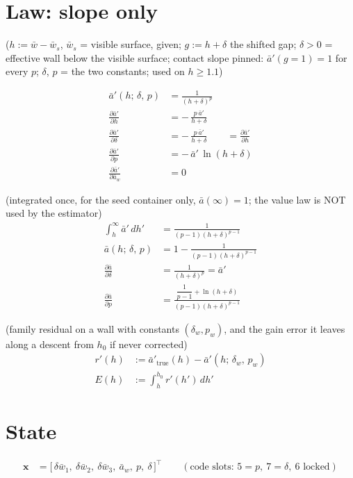 \documentclass[11pt,a4paper,fontset=none]{ctexart}
\newcommand{\ba}{\bar{a}}
\newcommand{\bw}{\bar{w}}
\newcommand{\ap}{\ba'}
\newcommand{\dl}{\delta}
\newcommand{\gs}{g}
\begin{document}
\section{Law: slope only}

($h := \bw - \bw_s$, $\bw_s$ = visible surface, given; $\gs := h + \dl$ the shifted gap; $\dl > 0$ = effective wall below the visible surface;
contact slope pinned: $\ap(\gs = 1) = 1$ for every $p$; $\dl$, $p$ = the two constants; used on $h \ge 1.1$)

\begin{align*}
\ap(h;\,\dl,\,p)                        &= \frac{1}{(h + \dl)^{p}} \\[2pt]
\frac{\partial\ap}{\partial h}          &= -\,\frac{p\,\ap}{h + \dl} \\[2pt]
\frac{\partial\ap}{\partial\dl}         &= -\,\frac{p\,\ap}{h + \dl} \qquad = \frac{\partial\ap}{\partial h} \\[2pt]
\frac{\partial\ap}{\partial p}          &= -\,\ap\,\ln(h + \dl) \\[2pt]
\frac{\partial\ap}{\partial\ba_w}       &= 0
\end{align*}

(integrated once, for the seed container only, $\ba(\infty) = 1$; the value law is NOT used by the estimator)
\begin{align*}
\int_{h}^{\infty}\ap\,dh'               &= \frac{1}{(p - 1)(h + \dl)^{p-1}} \\
\ba(h;\,\dl,\,p)                        &= 1 - \frac{1}{(p - 1)(h + \dl)^{p-1}} \\
\frac{\partial\ba}{\partial\dl}         &= \frac{1}{(h + \dl)^{p}} = \ap \\
\frac{\partial\ba}{\partial p}          &= \frac{\dfrac{1}{p-1} + \ln(h + \dl)}{(p - 1)(h + \dl)^{p-1}}
\end{align*}

(family residual on a wall with constants $(\dl_w, p_w)$, and the gain error it leaves along a descent from $h_0$ if never corrected)
\begin{align*}
r'(h)   &:= \ap_{\mathrm{true}}(h) - \ap(h;\,\dl_w,\,p_w) \\
E(h)    &:= \int_{h}^{h_0} r'(h')\,dh'
\end{align*}

\section{State}

\begin{align*}
\mathbf{x} &= \bigl[\,\delta\bw_1,\ \delta\bw_2,\ \delta\bw_3,\ \ba_w,\ p,\ \dl\,\bigr]^{\top}
\qquad(\text{code slots: } 5 = p,\ 7 = \dl,\ 6 \text{ locked})
\end{align*}
\end{document}

